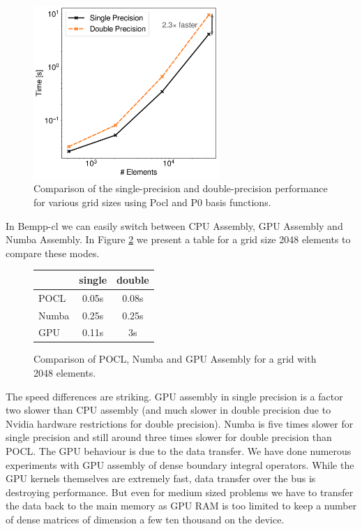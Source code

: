 \begin{figure}
	\center
	\includegraphics[width=7cm]{img/pocl_single_layer}
	\caption{Comparison of the single-precision and double-precision performance for various grid sizes using Pocl and P0 basis functions.}
	\label{fig:pocl_single_layer}
\end{figure}

In Bempp-cl we can easily switch between CPU Assembly, GPU Assembly and Numba Assembly. In Figure \ref{fig:cpu_gpu_numba_compare} we present a table for a grid size 2048 elements to compare these modes.
\begin{figure}
\begin{center}
\begin{tabular}{l|c|c}
	        &   single      &    double\\
	        \hline
	 POCL   &   0.05s       &    0.08s\\
	 Numba  &   0.25s       &    0.25s\\
	 GPU    &   0.11s       &    3s\\
\end{tabular}
\end{center}
\caption{Comparison of POCL, Numba and GPU Assembly for a grid with 2048 elements.}
\label{fig:cpu_gpu_numba_compare}
\end{figure}
The speed differences are striking. GPU assembly in single precision is a factor two slower than CPU assembly (and much slower in double precision due to Nvidia hardware restrictions for double precision). Numba is five times slower for single precision and still around three times slower for double precision than POCL. The GPU behaviour is due to the data transfer. We have done numerous experiments with GPU assembly of dense boundary integral operators. While the GPU kernels themselves are extremely fast, data transfer over the bus is destroying performance. But even for medium sized problems we have to transfer the data back to the main memory as GPU RAM is too limited to keep a number of dense matrices of dimension a few ten thousand on the device.

